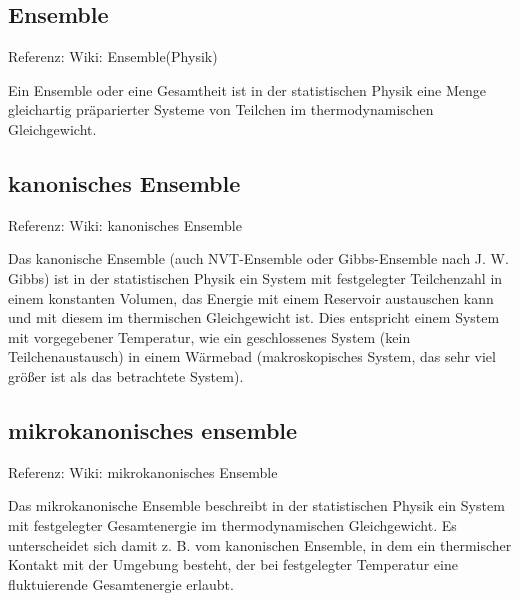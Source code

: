 \documentclass[]{article}
\begin{document}
\subsection{Ensemble}
Referenz: Wiki: Ensemble(Physik) 

Ein Ensemble oder eine Gesamtheit ist in der statistischen Physik eine Menge gleichartig präparierter Systeme von Teilchen im thermodynamischen Gleichgewicht. 

\subsection{kanonisches Ensemble}
Referenz: Wiki: kanonisches Ensemble

Das kanonische Ensemble (auch NVT-Ensemble oder Gibbs-Ensemble nach J. W. Gibbs) ist in der statistischen Physik ein System mit festgelegter Teilchenzahl in einem konstanten Volumen, das Energie mit einem Reservoir austauschen kann und mit diesem im thermischen Gleichgewicht ist. Dies entspricht einem System mit vorgegebener Temperatur, wie ein geschlossenes System (kein Teilchenaustausch) in einem Wärmebad (makroskopisches System, das sehr viel größer ist als das betrachtete System).

\subsection{mikrokanonisches ensemble}
Referenz: Wiki: mikrokanonisches Ensemble

Das mikrokanonische Ensemble beschreibt in der statistischen Physik ein System mit festgelegter Gesamtenergie im thermodynamischen Gleichgewicht. Es unterscheidet sich damit z. B. vom kanonischen Ensemble, in dem ein thermischer Kontakt mit der Umgebung besteht, der bei festgelegter Temperatur eine fluktuierende Gesamtenergie erlaubt.
\end{document}
